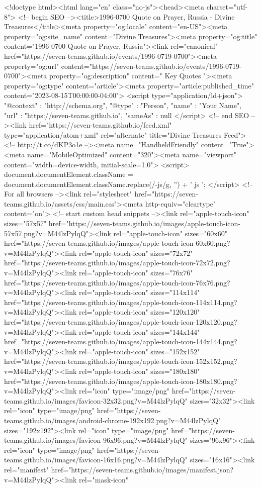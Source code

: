 <!doctype html><html lang="en" class="no-js"><head><meta charset="utf-8"> <!-- begin SEO --><title>1996-0700 Quote on Prayer, Russia - Divine Treasures</title><meta property="og:locale" content="en-US"><meta property="og:site_name" content="Divine Treasures"><meta property="og:title" content="1996-0700 Quote on Prayer, Russia"><link rel="canonical" href="https://seven-teams.github.io/events/1996-0719-0700"><meta property="og:url" content="https://seven-teams.github.io/events/1996-0719-0700"><meta property="og:description" content=" Key Quotes "><meta property="og:type" content="article"><meta property="article:published_time" content="2023-08-15T00:00:00-04:00"> <script type="application/ld+json"> { "@context" : "http://schema.org", "@type" : "Person", "name" : "Your Name", "url" : "https://seven-teams.github.io", "sameAs" : null } </script> <!-- end SEO --><link href="https://seven-teams.github.io/feed.xml" type="application/atom+xml" rel="alternate" title="Divine Treasures Feed"> <!-- http://t.co/dKP3o1e --><meta name="HandheldFriendly" content="True"><meta name="MobileOptimized" content="320"><meta name="viewport" content="width=device-width, initial-scale=1.0"> <script> document.documentElement.className = document.documentElement.className.replace(/\bno-js\b/g, '') + ' js '; </script> <!-- For all browsers --><link rel="stylesheet" href="https://seven-teams.github.io/assets/css/main.css"><meta http-equiv="cleartype" content="on"> <!-- start custom head snippets --><link rel="apple-touch-icon" sizes="57x57" href="https://seven-teams.github.io/images/apple-touch-icon-57x57.png?v=M44lzPylqQ"><link rel="apple-touch-icon" sizes="60x60" href="https://seven-teams.github.io/images/apple-touch-icon-60x60.png?v=M44lzPylqQ"><link rel="apple-touch-icon" sizes="72x72" href="https://seven-teams.github.io/images/apple-touch-icon-72x72.png?v=M44lzPylqQ"><link rel="apple-touch-icon" sizes="76x76" href="https://seven-teams.github.io/images/apple-touch-icon-76x76.png?v=M44lzPylqQ"><link rel="apple-touch-icon" sizes="114x114" href="https://seven-teams.github.io/images/apple-touch-icon-114x114.png?v=M44lzPylqQ"><link rel="apple-touch-icon" sizes="120x120" href="https://seven-teams.github.io/images/apple-touch-icon-120x120.png?v=M44lzPylqQ"><link rel="apple-touch-icon" sizes="144x144" href="https://seven-teams.github.io/images/apple-touch-icon-144x144.png?v=M44lzPylqQ"><link rel="apple-touch-icon" sizes="152x152" href="https://seven-teams.github.io/images/apple-touch-icon-152x152.png?v=M44lzPylqQ"><link rel="apple-touch-icon" sizes="180x180" href="https://seven-teams.github.io/images/apple-touch-icon-180x180.png?v=M44lzPylqQ"><link rel="icon" type="image/png" href="https://seven-teams.github.io/images/favicon-32x32.png?v=M44lzPylqQ" sizes="32x32"><link rel="icon" type="image/png" href="https://seven-teams.github.io/images/android-chrome-192x192.png?v=M44lzPylqQ" sizes="192x192"><link rel="icon" type="image/png" href="https://seven-teams.github.io/images/favicon-96x96.png?v=M44lzPylqQ" sizes="96x96"><link rel="icon" type="image/png" href="https://seven-teams.github.io/images/favicon-16x16.png?v=M44lzPylqQ" sizes="16x16"><link rel="manifest" href="https://seven-teams.github.io/images/manifest.json?v=M44lzPylqQ"><link rel="mask-icon" 